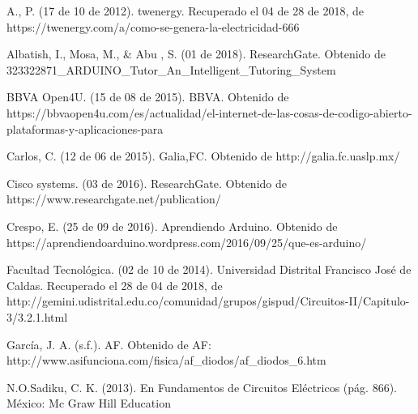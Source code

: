 \documentclass[12pt]{report}
\begin{document}




\newpage

\begin{thebibliography}{99}

A., P. (17 de 10 de 2012). twenergy. Recuperado el 04 de 28 de 2018, de https://twenergy.com/a/como-se-genera-la-electricidad-666

Albatish, I., Mosa, M., & Abu , S. (01 de 2018). ResearchGate. Obtenido de 323322871_ARDUINO_Tutor_An_Intelligent_Tutoring_System

BBVA Open4U. (15 de 08 de 2015). BBVA. Obtenido de https://bbvaopen4u.com/es/actualidad/el-internet-de-las-cosas-de-codigo-abierto-plataformas-y-aplicaciones-para

Carlos, C. (12 de 06 de 2015). Galia,FC. Obtenido de http://galia.fc.uaslp.mx/

Cisco systems. (03 de 2016). ResearchGate. Obtenido de https://www.researchgate.net/publication/

Crespo, E. (25 de 09 de 2016). Aprendiendo Arduino. Obtenido de https://aprendiendoarduino.wordpress.com/2016/09/25/que-es-arduino/

 Facultad Tecnológica. (02 de 10 de 2014). Universidad Distrital Francisco José de Caldas. Recuperado el 28 de 04 de 2018, de http://gemini.udistrital.edu.co/comunidad/grupos/gispud/Circuitos-II/Capitulo-3/3.2.1.html

García, J. A. (s.f.). AF. Obtenido de AF: http://www.asifunciona.com/fisica/af_diodos/af_diodos_6.htm

N.O.Sadiku, C. K. (2013). En Fundamentos de Circuitos Eléctricos (pág. 866). México: Mc Graw Hill Education
\end{thebibliography}
\end{document}
